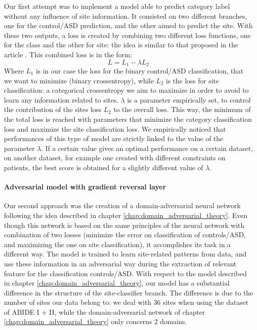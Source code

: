 \documentclass[11pt]{report}
\begin{document}
\noindent Our first attempt was to implement a model able to predict category label without any influence of site information.
It consisted on two different branches, one for the control/ASD prediction, and the other aimed to predict the site.
With these two outputs, a loss is created by combining two different loss functions, one for the class and the other for site: the idea is similar to that proposed in the article \cite{guan2021}.
This combined loss is in the form:
\begin{equation}
L = L_1 - \lambda L_2
\end{equation}
Where $L_1$  is in our case the loss for the binary control/ASD classification, that we want to minimize (binary crossentropy), while $L_2$ is the loss for site classification: a categorical crossentropy we aim to maximize in order to avoid to learn any information related to sites.
$\lambda $ is a parameter empirically set, to control the contribution of the sites loss $L_2$ to the overall loss.
This way, the minimum of the total loss is reached with parameters that minimize the category classification loss and maximize the site classification loss.
We empirically noticed that performances of this type of model are strictly linked to the value of the parameter $\lambda$.
If a certain value gives an optimal performance on a certain dataset, on another dataset, for example one created with different constraints on patients, the best score is obtained for a slightly different value of $\lambda$.

\paragraph{Adversarial model with gradient reversal layer}\hfill

\noindent Our second approach was the creation of a domain-adversarial neural network following the idea described in chapter \ref{chap:domain_adversarial_theory}.
Even though this network is based on the same principles of the neural network with combination of two losses (minimize the error on classification of controls/ASD, and maximizing the one on site classification), it accomplishes its task in a different way.
The model is trained to learn site-related patterns from data, and use these information in an adversarial way during the extraction of relevant feature for the classification controls/ASD.
With respect to the model described in chapter \ref{chap:domain_adversarial_theory}, our model has a substantial difference in the structure of the site-classifier branch.
The difference is due to the number of sites our data belong to: we deal with 36 sites when using the dataset of ABIDE I + II, while the domain-adversarial network of chapter \ref{chap:domain_adversarial_theory} only concerns 2 domains.
\end{document}
